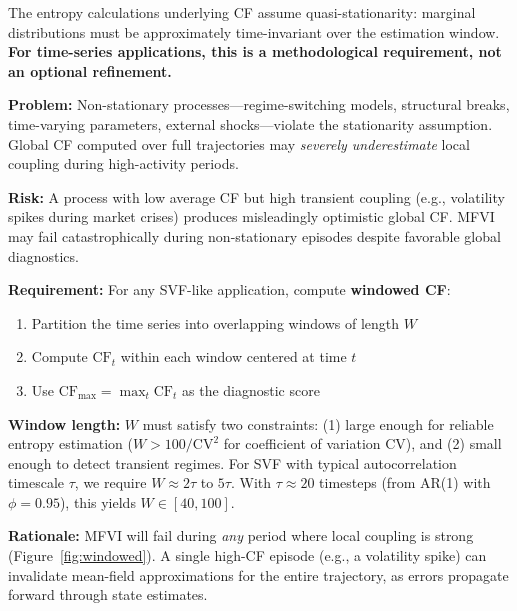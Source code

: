\documentclass[10pt]{article} %
\theoremstyle{plain}
\theoremstyle{definition}
\begin{document}
The entropy calculations underlying CF assume quasi-stationarity: marginal distributions must be approximately time-invariant over the estimation window. \textbf{For time-series applications, this is a methodological requirement, not an optional refinement.}

\begin{tcolorbox}[breakable, colback=gray!10, colframe=black, title=\textbf{Required: Windowed CF for Time Series}, fonttitle=\bfseries]
\textbf{Problem:} Non-stationary processes---regime-switching models, structural breaks, time-varying parameters, external shocks---violate the stationarity assumption. Global CF computed over full trajectories may \emph{severely underestimate} local coupling during high-activity periods.

\textbf{Risk:} A process with low average CF but high transient coupling (e.g., volatility spikes during market crises) produces misleadingly optimistic global CF. MFVI may fail catastrophically during non-stationary episodes despite favorable global diagnostics.

\textbf{Requirement:} For any SVF-like application, compute \textbf{windowed CF}:
\begin{enumerate}
    \item Partition the time series into overlapping windows of length $W$
    \item Compute $\text{CF}_t$ within each window centered at time $t$
    \item Use $\text{CF}_{\max} = \max_t \text{CF}_t$ as the diagnostic score
\end{enumerate}

\textbf{Window length:} $W$ must satisfy two constraints: (1) large enough for reliable entropy estimation ($W > 100/\text{CV}^2$ for coefficient of variation CV), and (2) small enough to detect transient regimes. For SVF with typical autocorrelation timescale $\tau$, we require $W \approx 2\tau$ to $5\tau$. With $\tau \approx 20$ timesteps (from AR(1) with $\phi = 0.95$), this yields $W \in [40, 100]$.

\textbf{Rationale:} MFVI will fail during \emph{any} period where local coupling is strong (Figure~\ref{fig:windowed}). A single high-CF episode (e.g., a volatility spike) can invalidate mean-field approximations for the entire trajectory, as errors propagate forward through state estimates.
\end{tcolorbox}
\end{document}
